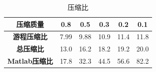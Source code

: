 \begin{table}[h!]
    \begin{center}
        \caption{压缩比}
        \begin{tabular}{c|ccccc}
            \textbf{压缩质量} & 0.8 & 0.5 & 0.3 & 0.2 & 0.1 \\
            \hline
            \textbf{游程压缩比}     & 7.99 & 9.88 & 10.9 & 11.4 & 11.8 \\
            \textbf{总压缩比}       & 13.0 & 16.2 & 18.2 & 19.2 & 20.0 \\
            \textbf{Matlab压缩比}   & 17.8 & 32.3 & 44.5 & 56.6 & 82.2 \\
        \end{tabular}
    \end{center}
\end{table}